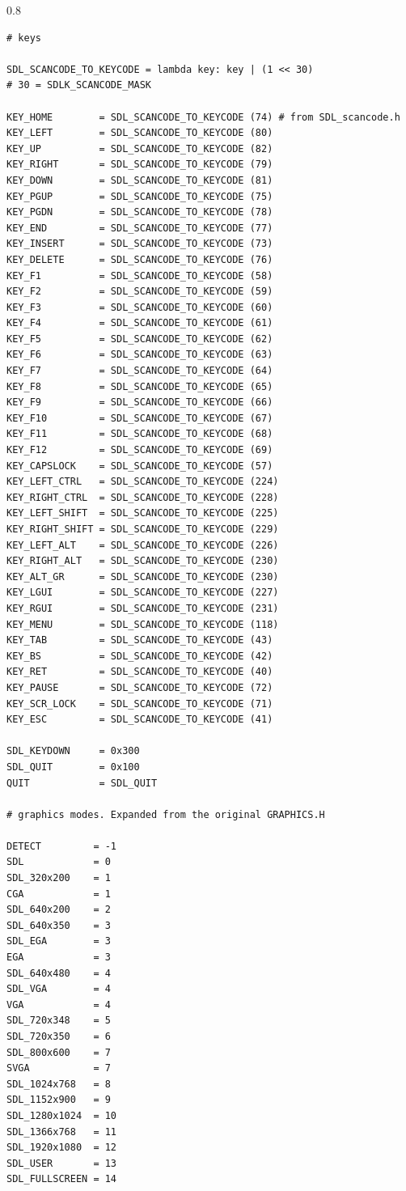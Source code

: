 \documentclass[a4paper,12pt]{article}
\newenvironment{margins}[2]
{ %
\begin{list}{}
{
\setlength{\leftmargin}{#1}
\setlength{\rightmargin}{#2}
} \item
} %
{\end{list}}
\begin{document}
\begin{margins}{-0.5cm}{-0.5cm}
\begin{spacing}{0.8}
\begin{lstlisting}
# keys

SDL_SCANCODE_TO_KEYCODE = lambda key: key | (1 << 30)
# 30 = SDLK_SCANCODE_MASK

KEY_HOME        = SDL_SCANCODE_TO_KEYCODE (74) # from SDL_scancode.h
KEY_LEFT        = SDL_SCANCODE_TO_KEYCODE (80)
KEY_UP          = SDL_SCANCODE_TO_KEYCODE (82)
KEY_RIGHT       = SDL_SCANCODE_TO_KEYCODE (79)
KEY_DOWN        = SDL_SCANCODE_TO_KEYCODE (81)
KEY_PGUP        = SDL_SCANCODE_TO_KEYCODE (75)
KEY_PGDN        = SDL_SCANCODE_TO_KEYCODE (78)
KEY_END         = SDL_SCANCODE_TO_KEYCODE (77)
KEY_INSERT      = SDL_SCANCODE_TO_KEYCODE (73)
KEY_DELETE      = SDL_SCANCODE_TO_KEYCODE (76)
KEY_F1          = SDL_SCANCODE_TO_KEYCODE (58)
KEY_F2          = SDL_SCANCODE_TO_KEYCODE (59)
KEY_F3          = SDL_SCANCODE_TO_KEYCODE (60)
KEY_F4          = SDL_SCANCODE_TO_KEYCODE (61)
KEY_F5          = SDL_SCANCODE_TO_KEYCODE (62)
KEY_F6          = SDL_SCANCODE_TO_KEYCODE (63)
KEY_F7          = SDL_SCANCODE_TO_KEYCODE (64)
KEY_F8          = SDL_SCANCODE_TO_KEYCODE (65)
KEY_F9          = SDL_SCANCODE_TO_KEYCODE (66)
KEY_F10         = SDL_SCANCODE_TO_KEYCODE (67)
KEY_F11         = SDL_SCANCODE_TO_KEYCODE (68)
KEY_F12         = SDL_SCANCODE_TO_KEYCODE (69)
KEY_CAPSLOCK    = SDL_SCANCODE_TO_KEYCODE (57)
KEY_LEFT_CTRL   = SDL_SCANCODE_TO_KEYCODE (224)
KEY_RIGHT_CTRL  = SDL_SCANCODE_TO_KEYCODE (228)
KEY_LEFT_SHIFT  = SDL_SCANCODE_TO_KEYCODE (225)
KEY_RIGHT_SHIFT = SDL_SCANCODE_TO_KEYCODE (229)
KEY_LEFT_ALT    = SDL_SCANCODE_TO_KEYCODE (226)
KEY_RIGHT_ALT   = SDL_SCANCODE_TO_KEYCODE (230)
KEY_ALT_GR      = SDL_SCANCODE_TO_KEYCODE (230)
KEY_LGUI        = SDL_SCANCODE_TO_KEYCODE (227)
KEY_RGUI        = SDL_SCANCODE_TO_KEYCODE (231)
KEY_MENU        = SDL_SCANCODE_TO_KEYCODE (118)
KEY_TAB         = SDL_SCANCODE_TO_KEYCODE (43)
KEY_BS          = SDL_SCANCODE_TO_KEYCODE (42)
KEY_RET         = SDL_SCANCODE_TO_KEYCODE (40)
KEY_PAUSE       = SDL_SCANCODE_TO_KEYCODE (72)
KEY_SCR_LOCK    = SDL_SCANCODE_TO_KEYCODE (71)
KEY_ESC         = SDL_SCANCODE_TO_KEYCODE (41)

SDL_KEYDOWN     = 0x300
SDL_QUIT        = 0x100
QUIT            = SDL_QUIT

# graphics modes. Expanded from the original GRAPHICS.H

DETECT         = -1
SDL            = 0
SDL_320x200    = 1
CGA            = 1 
SDL_640x200    = 2
SDL_640x350    = 3
SDL_EGA        = 3
EGA            = 3
SDL_640x480    = 4
SDL_VGA        = 4
VGA            = 4
SDL_720x348    = 5
SDL_720x350    = 6
SDL_800x600    = 7
SVGA           = 7
SDL_1024x768   = 8
SDL_1152x900   = 9
SDL_1280x1024  = 10
SDL_1366x768   = 11
SDL_1920x1080  = 12
SDL_USER       = 13
SDL_FULLSCREEN = 14


\end{lstlisting}
\end{spacing}
\end{margins}
\end{document}
